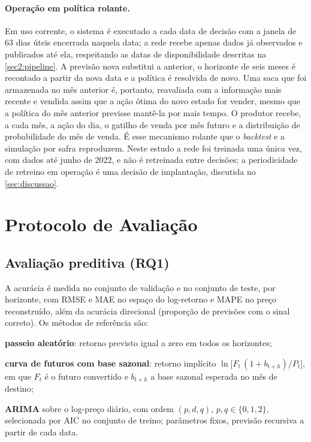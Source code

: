 \paragraph{Operação em política rolante.} Em uso corrente, o sistema é executado a cada data de decisão com a janela de 63 dias úteis encerrada naquela data; a rede recebe apenas dados já observados e publicados até ela, respeitando as datas de disponibilidade descritas na \autoref{sec2:pipeline}. A previsão nova substitui a anterior, o horizonte de seis meses é recontado a partir da nova data e a política é resolvida de novo. Uma saca que foi armazenada no mês anterior é, portanto, reavaliada com a informação mais recente e vendida assim que a ação ótima do novo estado for vender, mesmo que a política do mês anterior previsse mantê-la por mais tempo. O produtor recebe, a cada mês, a ação do dia, o gatilho de venda por mês futuro e a distribuição de probabilidade do mês de venda. É esse mecanismo rolante que o \textit{backtest} e a simulação por safra reproduzem. Neste estudo a rede foi treinada uma única vez, com dados até junho de 2022, e não é retreinada entre decisões; a periodicidade de retreino em operação é uma decisão de implantação, discutida no \autoref{sec:discussao}.

\section{Protocolo de Avaliação}\label{sec2:protocolo}

\subsection{Avaliação preditiva (RQ1)}

A acurácia é medida no conjunto de validação e no conjunto de teste, por horizonte, com RMSE e MAE no espaço do log-retorno e MAPE no preço reconstruído, além da acurácia direcional (proporção de previsões com o sinal correto). Os métodos de referência são:
\begin{alineas}
	\item \textbf{passeio aleatório}: retorno previsto igual a zero em todos os horizontes;
	\item \textbf{curva de futuros com base sazonal}: retorno implícito $\ln\big[F_t\,(1 + b_{t+h}) / P_t\big]$, em que $F_t$ é o futuro convertido e $b_{t+h}$ a base sazonal esperada no mês de destino;
	\item \textbf{ARIMA} sobre o log-preço diário, com ordem $(p,d,q)$, $p,q \in \{0,1,2\}$, selecionada por AIC no conjunto de treino; parâmetros fixos, previsão recursiva a partir de cada data.
\end{alineas}

